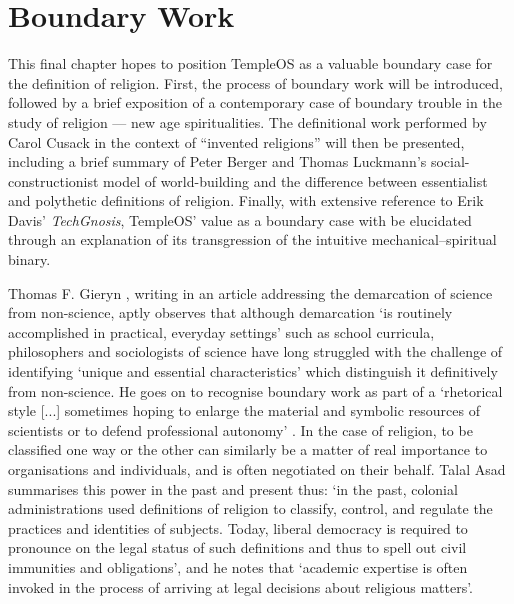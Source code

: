 \documentclass[Draft.tex]{subfiles}
\begin{document}
\chapter{Boundary Work}

This final chapter hopes to position TempleOS as a
valuable boundary case for the definition of religion.
First, the process of boundary work will be introduced,
followed by a brief exposition of a contemporary case of boundary trouble
in the study of religion --- new age spiritualities.
The definitional work performed by Carol Cusack in the context of
``invented religions'' will then be presented, including a brief summary of
Peter Berger and Thomas Luckmann's social-constructionist model of
world-building and the difference between essentialist and polythetic
definitions of religion.
Finally, with extensive reference to Erik Davis' \textit{TechGnosis},
TempleOS' value as a boundary case with be elucidated through
an explanation of its transgression of the intuitive mechanical--spiritual
binary.

Thomas F. Gieryn \parencite*[781]{Gieryn83}, writing in an article
addressing the demarcation of science from non-science, aptly observes
that although demarcation `is routinely accomplished in practical,
everyday settings' such as school curricula,
philosophers and sociologists of science have long struggled
with the challenge of identifying `unique and essential characteristics'
which distinguish it definitively from non-science.
He goes on to recognise boundary work as part of a `rhetorical style [...]
sometimes hoping to enlarge the material and symbolic resources of scientists
or to defend professional autonomy' \parencite[782]{Gieryn83}.
In the case of religion, to be classified one way or the other can similarly
be a matter of real importance to organisations and individuals,
and is often negotiated on their behalf.
Talal Asad \parencite*[39]{Asad11} summarises this power
in the past and present thus:
`in the past, colonial  administrations  used definitions of religion
to classify, control, and regulate the practices and identities of subjects.
Today, liberal democracy  is required to pronounce on the legal status
of such definitions and thus to spell out civil immunities and obligations',
and he notes that `academic expertise is often invoked
in the process of arriving at legal decisions about religious matters'.
\end{document}
